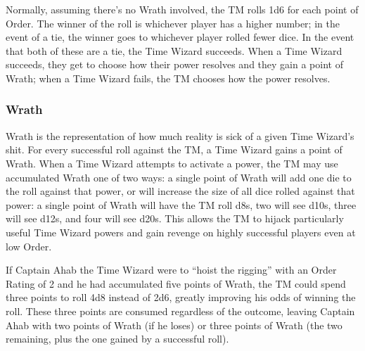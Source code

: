 \documentclass[twoside]{article}
\begin{document}
Normally, assuming there's no Wrath involved, the TM rolls 1d6 for each point of Order. The
winner of the roll is whichever player has a higher number; in the event of a tie, the winner
goes to whichever player rolled fewer dice. In the event that both of these are a tie, the
Time Wizard succeeds. When a Time Wizard succeeds, they get to choose how their power resolves
and they gain a point of Wrath; when a Time Wizard fails, the TM chooses how the power resolves.

\subsubsection{Wrath} \label{sssec:wrath}
Wrath is the representation of how much reality is sick of a given Time Wizard's shit. For
every successful roll against the TM, a Time Wizard gains a point of Wrath. When a Time Wizard
attempts to activate a power, the TM may use accumulated Wrath one of two ways: a single point
of Wrath will add one die to the roll against that power, or will increase the size of all dice
rolled against that power: a single point of Wrath will have the TM roll d8s, two will see
d10s, three will see d12s, and four will see d20s. This allows the TM to hijack particularly
useful Time Wizard powers and gain revenge on highly successful players even at low Order.

If Captain Ahab the Time Wizard were to ``hoist the rigging'' with an Order Rating of 2 and he
had accumulated five points of Wrath, the TM could spend three points to roll 4d8 instead of
2d6, greatly improving his odds of winning the roll. These three points are consumed regardless
of the outcome, leaving Captain Ahab with two points of Wrath (if he loses) or three points of
Wrath (the two remaining, plus the one gained by a successful roll).
\end{document}
